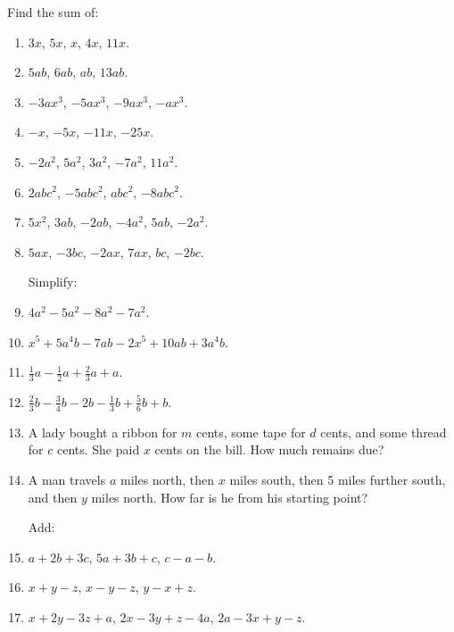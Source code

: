 \documentclass{book}
\begin{document}
Find the sum of:
\begin{enumerate}

\item $3x$, $5x$, $x$, $4x$, $11x$.

\item $5ab$, $6ab$, $ab$, $13ab$.

\item $-3ax^3$, $-5ax^3$, $-9ax^3$, $-ax^3$.

\item $-x$, $-5x$, $-11x$, $-25x$.

\item $-2a^2$, $5a^2$, $3a^2$, $-7a^2$, $11a^2$.

\item $2abc^2$, $-5abc^2$, $abc^2$, $-8abc^2$.

\item $5x^2$, $3ab$, $-2ab$, $-4a^2$, $5ab$, $-2a^2$.

\item $5ax$, $-3bc$, $-2ax$, $7ax$, $bc$, $-2bc$.

Simplify:

\item $4a^2 - 5a^2 - 8a^2 - 7a^2$.

\item $x^5 + 5a^4b - 7ab - 2x^5 + 10ab + 3a^4b$.

\item $\frac{1}{3}a - \frac{1}{2}a + \frac{2}{3}a + a$.

\item $\frac{2}{3}b - \frac{3}{4}b - 2b - \frac{1}{3}b +
\frac{5}{6}b + b$.

\item A lady bought a ribbon for $m$ cents, some tape for $d$
cents, and some thread for $c$ cents. She paid $x$ cents on the
bill. How much remains due?

\item A man travels $a$ miles north, then $x$ miles south, then 5
miles further south, and then $y$ miles north. How far is he from
his starting point?

Add:

\item $a + 2b + 3c$, $5a + 3b + c$, $c - a - b$.

\item $x + y - z$, $x - y - z$, $y - x + z$.

\item $x + 2y - 3z + a$, $2x - 3y + z - 4a$, $2a - 3x + y - z$.


\end{enumerate}
\end{document}
